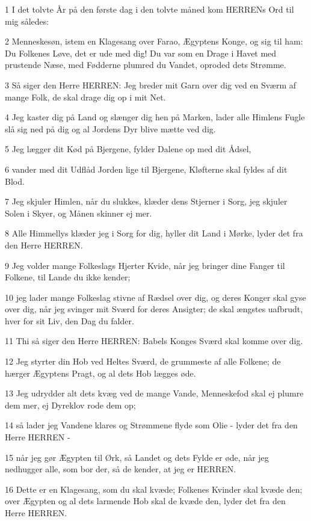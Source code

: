 \par 1 I det tolvte År på den første dag i den tolvte måned kom HERRENs Ord til mig således:
\par 2 Menneskesøn, istem en Klagesang over Farao, Ægyptens Konge, og sig til ham: Du Folkenes Løve, det er ude med dig! Du var som en Drage i Havet med prustende Næse, med Fødderne plumred du Vandet, oproded dets Strømme.
\par 3 Så siger den Herre HERREN: Jeg breder mit Garn over dig ved en Sværm af mange Folk, de skal drage dig op i mit Net.
\par 4 Jeg kaster dig på Land og slænger dig hen på Marken, lader alle Himlens Fugle slå sig ned på dig og al Jordens Dyr blive mætte ved dig.
\par 5 Jeg lægger dit Kød på Bjergene, fylder Dalene op med dit Ådsel,
\par 6 vander med dit Udflåd Jorden lige til Bjergene, Kløfterne skal fyldes af dit Blod.
\par 7 Jeg skjuler Himlen, når du slukkes, klæder dens Stjerner i Sorg, jeg skjuler Solen i Skyer, og Månen skinner ej mer.
\par 8 Alle Himmellys klæder jeg i Sorg for dig, hyller dit Land i Mørke, lyder det fra den Herre HERREN.
\par 9 Jeg volder mange Folkeslags Hjerter Kvide, når jeg bringer dine Fanger til Folkene, til Lande du ikke kender;
\par 10 jeg lader mange Folkeslag stivne af Rædsel over dig, og deres Konger skal gyse over dig, når jeg svinger mit Sværd for deres Ansigter; de skal ængstes uafbrudt, hver for sit Liv, den Dag du falder.
\par 11 Thi så siger den Herre HERREN: Babels Konges Sværd skal komme over dig.
\par 12 Jeg styrter din Hob ved Heltes Sværd, de grummeste af alle Folkene; de hærger Ægyptens Pragt, og al dets Hob lægges øde.
\par 13 Jeg udrydder alt dets kvæg ved de mange Vande, Menneskefod skal ej plumre dem mer, ej Dyreklov rode dem op;
\par 14 så lader jeg Vandene klares og Strømmene flyde som Olie - lyder det fra den Herre HERREN -
\par 15 når jeg gør Ægypten til Ørk, så Landet og dets Fylde er øde, når jeg nedhugger alle, som bor der, så de kender, at jeg er HERREN.
\par 16 Dette er en Klagesang, som du skal kvæde; Folkenes Kvinder skal kvæde den; over Ægypten og al dets larmende Hob skal de kvæde den, lyder det fra den Herre HERREN.
